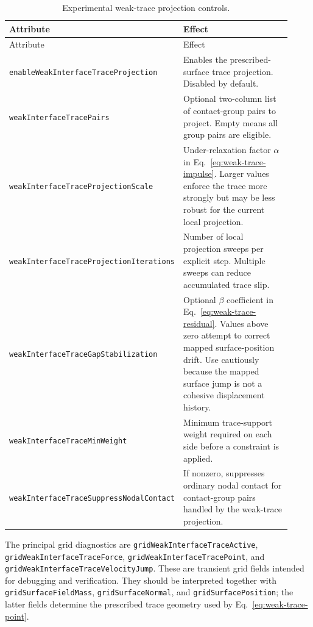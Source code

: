 \begingroup\small
\begin{longtable}{>{\raggedright\arraybackslash}p{0.38\linewidth}>{\raggedright\arraybackslash}p{0.54\linewidth}}
\caption{Experimental weak-trace projection controls.}\label{tab:weak-trace-controls}\\
\toprule
Attribute & Effect \\
\midrule
\endfirsthead
\toprule
Attribute & Effect \\
\midrule
\endhead
\texttt{enableWeakInterfaceTraceProjection} & Enables the prescribed-surface trace projection.  Disabled by default. \\
\texttt{weakInterfaceTracePairs} & Optional two-column list of contact-group pairs to project.  Empty means all group pairs are eligible. \\
\texttt{weakInterfaceTraceProjectionScale} & Under-relaxation factor $\alpha$ in Eq.~\eqref{eq:weak-trace-impulse}.  Larger values enforce the trace more strongly but may be less robust for the current local projection. \\
\texttt{weakInterfaceTraceProjectionIterations} & Number of local projection sweeps per explicit step.  Multiple sweeps can reduce accumulated trace slip. \\
\texttt{weakInterfaceTraceGapStabilization} & Optional $\beta$ coefficient in Eq.~\eqref{eq:weak-trace-residual}.  Values above zero attempt to correct mapped surface-position drift.  Use cautiously because the mapped surface jump is not a cohesive displacement history. \\
\texttt{weakInterfaceTraceMinWeight} & Minimum trace-support weight required on each side before a constraint is applied. \\
\texttt{weakInterfaceTraceSuppressNodalContact} & If nonzero, suppresses ordinary nodal contact for contact-group pairs handled by the weak-trace projection. \\
\bottomrule
\end{longtable}
\endgroup

The principal grid diagnostics are \texttt{gridWeakInterfaceTraceActive}, \texttt{gridWeakInterfaceTraceForce}, \texttt{gridWeakInterfaceTracePoint}, and \texttt{gridWeakInterfaceTraceVelocityJump}.  These are transient grid fields intended for debugging and verification.  They should be interpreted together with \texttt{gridSurfaceFieldMass}, \texttt{gridSurfaceNormal}, and \texttt{gridSurfacePosition}; the latter fields determine the prescribed trace geometry used by Eq.~\eqref{eq:weak-trace-point}.

